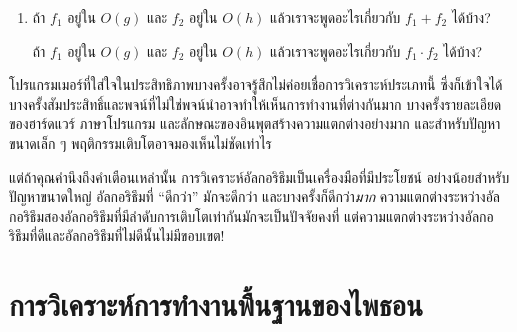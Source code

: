 \begin{exercise}
\begin{enumerate}

\item ถ้า {\scriptsize$f_1$} อยู่ใน {\scriptsize$O(g)$} และ {\scriptsize$f_2$} อยู่ใน {\scriptsize$O(h)$} แล้วเราจะพูดอะไรเกี่ยวกับ {\scriptsize$f_1 + f_2$} ได้บ้าง?


ถ้า {\scriptsize$f_1$} อยู่ใน {\scriptsize$O(g)$} และ {\scriptsize$f_2$} อยู่ใน {\scriptsize$O(h)$} แล้วเราจะพูดอะไรเกี่ยวกับ {\scriptsize$f_1 \cdot f_2$} ได้บ้าง?

\end{enumerate}

\end{exercise}


โปรแกรมเมอร์ที่ใส่ใจในประสิทธิภาพบางครั้งอาจรู้สึกไม่ค่อยเชื่อการวิเคราะห์ประเภทนี้ 
ซึ่งก็เข้าใจได้
บางครั้งสัมประสิทธิ์และพจน์ที่ไม่ใช่พจน์นำอาจทำให้เห็นการทำงานที่ต่างกันมาก
บางครั้งรายละเอียดของฮาร์ดแวร์ ภาษาโปรแกรม และลักษณะของอินพุตสร้างความแตกต่างอย่างมาก 
และสำหรับปัญหาขนาดเล็ก ๆ พฤติกรรมเติบโตอาจมองเห็นไม่ชัดเท่าไร



แต่ถ้าคุณคำนึงถึงคำเตือนเหล่านั้น การวิเคราะห์อัลกอริธึมเป็นเครื่องมือที่มีประโยชน์ อย่างน้อยสำหรับปัญหาขนาดใหญ่ 
อัลกอริธึมที่ ``ดีกว่า'' มักจะดีกว่า และบางครั้งก็ดีกว่า{\em มาก} ความแตกต่างระหว่างอัลกอริธึมสองอัลกอริธึมที่มีลำดับการเติบโตเท่ากันมักจะเป็นปัจจัยคงที่ 
แต่ความแตกต่างระหว่างอัลกอริธึมที่ดีและอัลกอริธึมที่ไม่ดีนั้นไม่มีขอบเขต!


\section{การวิเคราะห์การทำงานพื้นฐานของไพธอน} %

